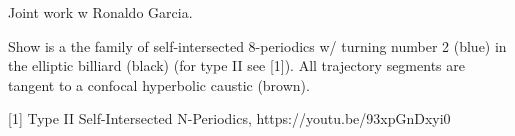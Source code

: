 Joint work w Ronaldo Garcia.

Show is a the family of self-intersected 8-periodics w/ turning number 2 (blue) in the elliptic billiard (black) (for type II see [1]). All trajectory segments are tangent to a confocal hyperbolic caustic (brown).

[1] Type II Self-Intersected N-Periodics, https://youtu.be/93xpGnDxyi0